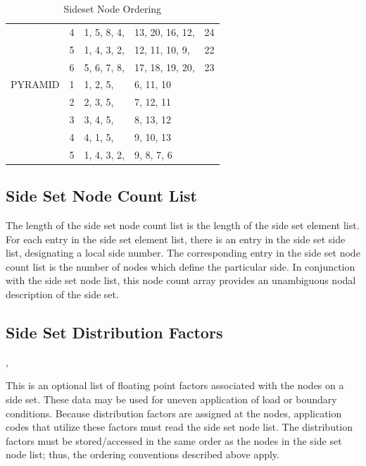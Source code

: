 \begin{table}
\begin{center}
\begin{tabular}{l|c|lll}
       & 4 & 1, 5, 8, 4, & 13, 20, 16, 12, & 24 \\ 
       & 5 & 1, 4, 3, 2, & 12, 11, 10, 9, & 22 \\ 
       & 6 & 5, 6, 7, 8, & 17, 18, 19, 20, & 23 \\ \hline
PYRAMID&1 & 1, 2, 5, & 6, 11, 10 \\ 
       & 2 & 2, 3, 5, & 7, 12, 11 \\ 
       & 3 & 3, 4, 5, & 8, 13, 12 \\ 
       & 4 & 4, 1, 5, & 9, 10, 13 \\ 
       & 5 & 1, 4, 3, 2, & 9, 8, 7, 6
\end{tabular}
\caption{Sideset Node Ordering}\label{t:sset_node_ordering}
\end{center}
\end{table}

\subsection{Side Set Node Count List}


\begin{spacing}{1.5}
\api {}
\end{spacing}

The length of the side set node count list is the length of the side
set element list. For each entry in the side set element list, there
is an entry in the side set side list, designating a local side
number. The corresponding entry in the side set node count list is the
number of nodes which define the particular side. In conjunction with
the side set node list, this node count array provides an unambiguous
nodal description of the side set.

\subsection{Side Set Distribution Factors}


\begin{spacing}{1.5}
\api {}, 
\end{spacing}

This is an optional list of floating point factors associated with the
nodes on a side set. These data may be used for uneven application of
load or boundary conditions. Because distribution factors are assigned
at the nodes, application codes that utilize these factors must read
the side set node list. The distribution factors must be
stored/accessed in the same order as the nodes in the side set node
list; thus, the ordering conventions described above apply.


